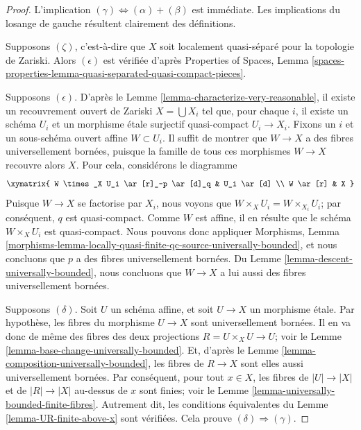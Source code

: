 \begin{proof}
L'implication $(\gamma) \Leftrightarrow (\alpha) + (\beta)$ est immédiate.
Les implications du losange de gauche résultent clairement des définitions.

\medskip\noindent
Supposons $(\zeta)$, c'est-à-dire que $X$ soit localement quasi-séparé pour
la topologie de Zariski. Alors $(\epsilon)$ est vérifiée d'après
Properties of Spaces, Lemma
\ref{spaces-properties-lemma-quasi-separated-quasi-compact-pieces}.

\medskip\noindent
Supposons $(\epsilon)$. D'après le
Lemme \ref{lemma-characterize-very-reasonable},
il existe un recouvrement ouvert de Zariski $X = \bigcup X_i$ tel que, pour
chaque $i$, il existe un schéma $U_i$ et un morphisme étale surjectif
quasi-compact $U_i \to X_i$. Fixons un $i$ et un sous-schéma ouvert affine
$W \subset U_i$. Il suffit de montrer que $W \to X$ a des fibres
universellement bornées, puisque la famille de tous ces morphismes
$W \to X$ recouvre alors $X$.
Pour cela, considérons le diagramme
$$
\xymatrix{
W \times_X U_i \ar[r]_-p \ar[d]_q & U_i \ar[d] \\
W \ar[r] & X
}
$$
Puisque $W \to X$ se factorise par $X_i$, nous voyons que
$W \times_X U_i = W \times_{X_i} U_i$; par conséquent, $q$ est quasi-compact.
Comme $W$ est affine, il en résulte que le schéma $W \times_X U_i$
est quasi-compact. Nous pouvons donc appliquer
Morphisms, Lemma
\ref{morphisms-lemma-locally-quasi-finite-qc-source-universally-bounded},
et nous concluons que $p$ a des fibres universellement bornées. Du
Lemme \ref{lemma-descent-universally-bounded},
nous concluons que $W \to X$ a lui aussi des fibres universellement bornées.

\medskip\noindent
Supposons $(\delta)$. Soit $U$ un schéma affine, et soit $U \to X$ un morphisme
étale. Par hypothèse, les fibres du morphisme $U \to X$ sont universellement
bornées. Il en va donc de même des fibres des deux projections
$R = U \times_X U \to U$; voir le
Lemme \ref{lemma-base-change-universally-bounded}.
Et, d'après le
Lemme \ref{lemma-composition-universally-bounded},
les fibres de $R \to X$ sont elles aussi universellement bornées.
Par conséquent, pour tout $x \in X$, les fibres de $|U| \to |X|$ et de
$|R| \to |X|$ au-dessus de $x$ sont finies; voir le
Lemme \ref{lemma-universally-bounded-finite-fibres}.
Autrement dit, les conditions équivalentes du
Lemme \ref{lemma-UR-finite-above-x}
sont vérifiées. Cela prouve $(\delta) \Rightarrow (\gamma)$.
\end{proof}

